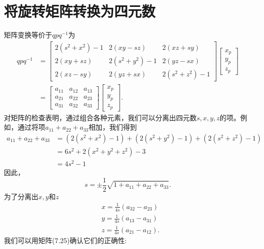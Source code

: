 \section{将旋转矩阵转换为四元数}
矩阵变换等价于$q p q^{-1}$为
$$
\begin{aligned}
q p q^{-1} & =\left[\begin{array}{ccc}
2\left(s^{2}+x^{2}\right)-1 & 2(x y-s z) & 2(x z+s y) \\
2(x y+s z) & 2\left(s^{2}+y^{2}\right)-1 & 2(y z-s x) \\
2(x z-s y) & 2(y z+s x) & 2\left(s^{2}+z^{2}\right)-1
\end{array}\right]\left[\begin{array}{l}
x_{p} \\
y_{p} \\
z_{p}
\end{array}\right] \\
& =\left[\begin{array}{lll}
a_{11} & a_{12} & a_{13} \\
a_{21} & a_{22} & a_{23} \\
a_{31} & a_{32} & a_{33}
\end{array}\right]\left[\begin{array}{l}
x_{p} \\
y_{p} \\
z_{p}
\end{array}\right] .
\end{aligned}
$$
对矩阵的检查表明，通过组合各种元素，我们可以分离出四元数$s, x, y, z$的项。例如，通过将项$a_{11}+a_{22}+a_{33}$相加，我们得到
$$
\begin{aligned}
a_{11}+a_{22}+a_{33} & =\left(2\left(s^{2}+x^{2}\right)-1\right)+\left(2\left(s^{2}+y^{2}\right)-1\right)+\left(2\left(s^{2}+z^{2}\right)-1\right) \\
& =6 s^{2}+2\left(x^{2}+y^{2}+z^{2}\right)-3 \\
& =4 s^{2}-1
\end{aligned}
$$
因此，
$$
s=\pm \frac{1}{2} \sqrt{1+a_{11}+a_{22}+a_{33}} .
$$
为了分离出$x, y$和$z$
$$
\begin{aligned}
& x=\frac{1}{4 s}\left(a_{32}-a_{23}\right) \\
& y=\frac{1}{4 s}\left(a_{13}-a_{31}\right) \\
& z=\frac{1}{4 s}\left(a_{21}-a_{12}\right) .
\end{aligned}
$$
我们可以用矩阵(7.25)确认它们的正确性:
